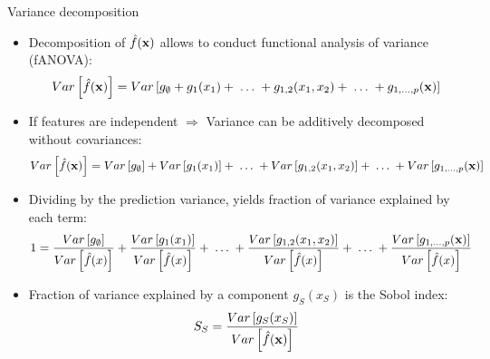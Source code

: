 \documentclass[11pt,compress,t,notes=noshow, aspectratio=169, xcolor=table]{beamer}
\newcommand{\open}{}
\newcommand{\close}{}
\begin{document}
\begin{frame}{Variance decomposition}

\begin{itemize}
\item Decomposition of $\hat{f}(\xv)$ allows to conduct functional analysis of variance (fANOVA):
$$ Var\left[\hat{f}(\xv)\right] = Var\left[g_{\open \emptyset \close} + g_{\open 1 \close}(x_1) + \;\dots\; + g_{\open 1, 2 \close}(x_1, x_2) + \;\dots\; + g_{\open 1,\ldots,p \close}(\xv) \right]$$
\item If features are independent $\Rightarrow$ Variance can be additively decomposed without covariances:
$$Var\left[\hat{f}(\xv)\right] = Var\left[g_{\open \emptyset \close}\right] + Var\left[g_{\open 1 \close}(x_1)\right] + \;\dots\; + Var\left[g_{\open 1, 2 \close}(x_1, x_2)\right] + \;\dots\; + Var\left[g_{\open 1,\ldots,p \close}(\xv)\right]$$


\item Dividing by the prediction variance, yields fraction of variance explained by each term:
\begin{align*}
1 &= \frac{Var\left[g_{\open \emptyset \close}\right]}{\predvar} + \frac{Var\left[g_{\open 1 \close}(x_1)\right]}{\predvar} + %
\;\dots\;
+ \frac{Var\left[g_{\open 1, 2 \close}(x_1, x_2)\right]}{\predvar} + \;\dots\; + \frac{Var\left[g_{\open 1,\ldots,p \close}(\xv)\right]}{\predvar}
\end{align*}

\item Fraction of variance explained by a component $g_{\open S \close}(x_S)$ is the Sobol index:
$$
S_S = \frac{Var\left[g_{\open S \close}(x_S)\right]}{Var\left[\hat{f}(\xv)\right]}
$$
\end{itemize}

\end{frame}


\endlecture
\end{document}
